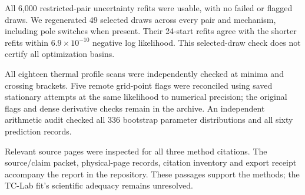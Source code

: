 All 6,000 restricted-pair uncertainty refits were usable, with no failed or flagged draws. We regenerated 49 selected draws across every pair and mechanism, including pole switches when present. Their 24-start refits agree with the shorter refits within $6.9\times10^{-10}$ negative log likelihood. This selected-draw check does not certify all optimization basins.

All eighteen thermal profile scans were independently checked at minima and crossing brackets. Five remote grid-point flags were reconciled using saved stationary attempts at the same likelihood to numerical precision; the original flags and dense derivative checks remain in the archive. An independent arithmetic audit checked all 336 bootstrap parameter distributions and all sixty prediction records.

Relevant source pages were inspected for all three method citations. The source/claim packet, physical-page records, citation inventory and export receipt accompany the report in the repository. These passages support the methods; the TC-Lab fit's scientific adequacy remains unresolved.
